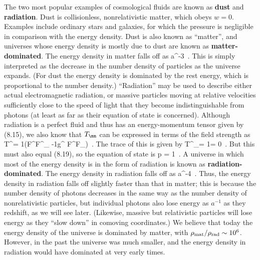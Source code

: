 The two most popular examples of cosmological fluids are
known as {\bf dust} and {\bf radiation}.  Dust is collisionless,
nonrelativistic matter, which obeys $w=0$.  Examples include 
ordinary stars and galaxies, for which the pressure is 
negligible in comparison with the energy density.  Dust is also
known as ``matter'', and universes whose energy density is mostly
due to dust are
known as {\bf matter-dominated}.  The energy density in matter
falls off as 
\be
  \rho\propto a^{-3}\ .\label{8.24}
\ee
This is simply interpreted
as the decrease in the number density of particles as the universe
expands.  (For dust the energy density is dominated by the rest
energy, which is proportional to the number density.)  ``Radiation''
may be used to describe either actual electromagnetic radiation, or
massive particles moving at relative velocities sufficiently close to 
the speed of light that they become indistinguishable from photons (at
least as far as their equation of state is concerned).
Although radiation is a perfect fluid and thus has an energy-momentum
tensor given by (8.15), we also know that $T_\mn$ can be expressed in
terms of the field strength as
\be
  T^\mn = {1\over{4\pi}}(F^{\mu\lambda}F^\nu{}_\lambda
  -{1}g^{\mu\nu} F^{\lambda\sigma}F_{\lambda\sigma})\ .
  \label{8.25}
\ee
The trace of this is given by
\be
  T^\mu{}_\mu = {1\over{4\pi}} = 0\ .\label{8.26}
\ee
But this must also equal (8.19), so the equation of state is
\be
  p = {1}\rho\ .\label{8.27}
\ee
A universe in which most of the energy density is in the form of
radiation is known as {\bf radiation-dominated}.  The energy
density in radiation falls off as
\be
  \rho \propto a^{-4}\ .\label{8.28}
\ee
Thus, the energy density in radiation falls off slightly faster
than that in matter; this is because the number density of photons
decreases in the same way as the number density of nonrelativistic
particles, but individual photons also lose energy as $a^{-1}$
as they redshift, as we will see later.  (Likewise, massive but
relativistic particles will lose energy as they ``slow down'' in
comoving coordinates.)  We believe that today the
energy density of the universe is dominated by matter, with
$\rho_{\rm mat}/\rho_{\rm rad}\sim10^6$.  However, in the past 
the universe was much smaller, and the energy density in radiation
would have dominated at very early times.

